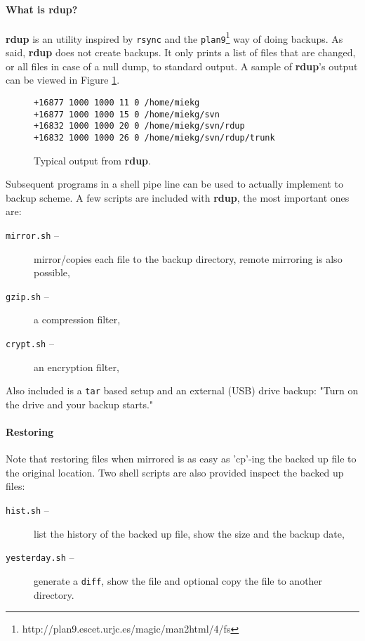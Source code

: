 \documentclass[a4, 10pt]{article}
\newcommand{\rdup}{\textbf{rdup}}
\newcommand{\cmd}[1]{\texttt{#1}}
\begin{document}
\paragraph{What is \rdup?}
\rdup{} is an utility inspired by \cmd{rsync} and the 
\cmd{plan9}\footnote{http://plan9.escet.urjc.es/magic/man2html/4/fs} 
way of doing backups. As said, \rdup{} does not create backups. It only
prints a list of files that are changed, or all files in case of a null
dump, to standard output. A sample of \rdup's output can be viewed in
Figure \ref{fig1:rdup}.

\begin{figure}[hbt]
\begin{verbatim}
+16877 1000 1000 11 0 /home/miekg
+16877 1000 1000 15 0 /home/miekg/svn
+16832 1000 1000 20 0 /home/miekg/svn/rdup
+16832 1000 1000 26 0 /home/miekg/svn/rdup/trunk
\end{verbatim}
\caption{Typical output from \rdup.}
\label{fig1:rdup}
\end{figure}

Subsequent programs in a shell pipe line can be used to actually
implement to backup scheme. A few scripts are included with \rdup, 
the most important ones are:
\begin{description}
        \item[\cmd{mirror.sh} --]{
                mirror/copies each file to the backup directory, remote 
                mirroring is also possible,}
        \item[\cmd{gzip.sh} --]{
                a compression filter,}
        \item[\cmd{crypt.sh} --]{
                an encryption filter,}
\end{description}

Also included is a \cmd{tar} based setup and an external (USB) drive
backup: "Turn on the drive and your backup starts."

\paragraph{Restoring}
Note that restoring files when mirrored is as easy as 'cp'-ing the
backed up file to the original location. Two shell scripts are
also provided inspect the backed up files:
\begin{description}
        \item[\cmd{hist.sh} --]{
                list the history of the backed up file, show the size
                and the backup date,}
        \item[\cmd{yesterday.sh} --]{
                generate a \cmd{diff}, show the file and optional copy 
                the file to another directory.}
\end{description}
\end{document}
